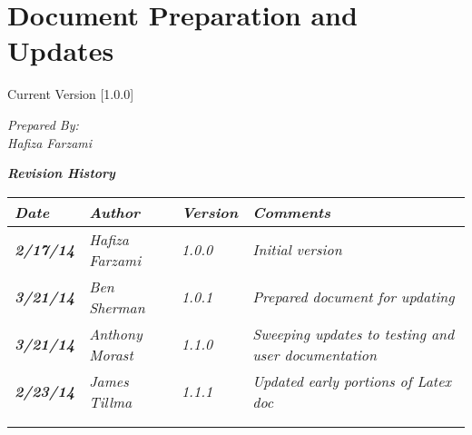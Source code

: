 
\chapter{Document Preparation and Updates}

Current Version [1.0.0]
\vspace*{5mm}

{\color{MSBlue3}
\noindent
\textit{Prepared By:}\\
\textit{Hafiza Farzami}\\
}

\vfill
\noindent
{\color{color02} \textit{\textbf{Revision History}}}\\
\begin{tabular}{|>{\raggedright}p{1.5cm}|>{\raggedright}p{3cm}|>{\raggedright}p{1.5cm}|>{\raggedright}p{9cm}|}
\hline
\textit{\textbf{Date}} &  \textit{\textbf{Author}} & \textit{\textbf{Version}} & \textit{\textbf{Comments}}\tabularnewline
\hline
 \textit{\textbf{2/17/14}} & \textit{Hafiza Farzami} & \textit{1.0.0} & \textit{Initial version}\tabularnewline
\hline
 \textit{\textbf{3/21/14}} & \textit{Ben Sherman} & \textit{1.0.1} & \textit{Prepared document for updating}\tabularnewline
 \hline
 \textit{\textbf{3/21/14}} & \textit{Anthony Morast} & \textit{1.1.0} & \textit{Sweeping updates to testing and user documentation}\tabularnewline
\hline
 \textit{\textbf{2/23/14}} & \textit{James Tillma} & \textit{1.1.1} & \textit{Updated early portions of Latex doc}\tabularnewline
\hline
 &  &  & \tabularnewline
\hline
 &  &  & \tabularnewline
\hline
\end{tabular}
\vfill

